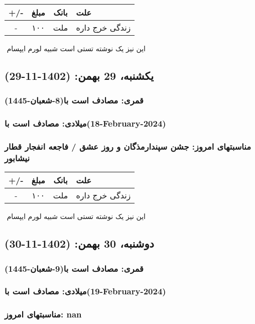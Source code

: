 \documentclass{article}
\newcommand{\rnote}[1]{\marginpar{\textcolor{color}{\StrSubstitute{\##1}{ }{\_}}}}
\newcommand{\myRow}[4]{
    #1 & #2 & #3 & #4 \\ \hline
}
\begin{document}
\begin{tabular}{ | c | c | c | p{5cm} |}
    \hline
    \myRow{ +/- }{مبلغ}{بانک}{علت}
    \myRow{-}{۱۰۰}{ملت}{زندگی خرج داره}
\end{tabular}
\newline
\newline

‌
\rnote{تست}
این نیز یک نوشته تستی است شبیه لورم ایپسام




\newpage
{}
\textcolor{color}{
\section{ یکشنبه، 29 بهمن: (1402-11-29) }
\subsubsection*{قمری: مصادف است با(8-شعبان-1445)} 
\subsubsection*{میلادی: مصادف است با(18-February-2024)}
\subsubsection*{مناسبتهای امروز: جشن سپندارمذگان و روز عشق / فاجعه انفجار قطار نیشابور}
}


\begin{tabular}{ | c | c | c | p{5cm} |}
    \hline
    \myRow{ +/- }{مبلغ}{بانک}{علت}
    \myRow{-}{۱۰۰}{ملت}{زندگی خرج داره}
\end{tabular}
\newline
\newline

‌
\rnote{تست}
این نیز یک نوشته تستی است شبیه لورم ایپسام




\newpage
{}
\textcolor{color}{
\section{ دوشنبه، 30 بهمن: (1402-11-30) }
\subsubsection*{قمری: مصادف است با(9-شعبان-1445)} 
\subsubsection*{میلادی: مصادف است با(19-February-2024)}
\subsubsection*{مناسبتهای امروز: nan}
}
\end{document}
